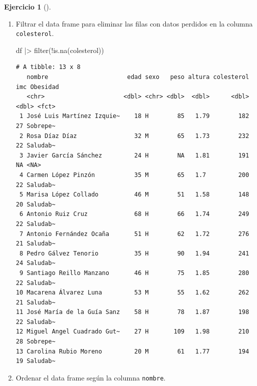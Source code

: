 \documentclass[
  a4paper,
]{scrreport}
\newenvironment{Shaded}{\begin{snugshade}}{\end{snugshade}}
\newcommand{\FunctionTok}[1]{\textcolor[rgb]{0.28,0.35,0.67}{#1}}
\newcommand{\NormalTok}[1]{\textcolor[rgb]{0.00,0.23,0.31}{#1}}
\newcommand{\SpecialCharTok}[1]{\textcolor[rgb]{0.37,0.37,0.37}{#1}}
\theoremstyle{definition}
\newtheorem{exercise}{Ejercicio}[chapter]
\theoremstyle{remark}
\begin{document}
\begin{exercise}[]
\begin{enumerate}
\begin{tcolorbox}
  \end{tcolorbox}
\item
  Filtrar el data frame para eliminar las filas con datos perdidos en la
  columna \texttt{colesterol}.

  \begin{tcolorbox}[enhanced jigsaw, toprule=.15mm, rightrule=.15mm, arc=.35mm, colback=white, colbacktitle=quarto-callout-tip-color!10!white, toptitle=1mm, left=2mm, colframe=quarto-callout-tip-color-frame, opacityback=0, breakable, opacitybacktitle=0.6, bottomtitle=1mm, titlerule=0mm, title=\textcolor{quarto-callout-tip-color}{\faLightbulb}\hspace{0.5em}{Solución}, bottomrule=.15mm, coltitle=black, leftrule=.75mm]

\begin{Shaded}
\begin{Highlighting}[]
\NormalTok{df }\SpecialCharTok{|\textgreater{}}
    \FunctionTok{filter}\NormalTok{(}\SpecialCharTok{!}\FunctionTok{is.na}\NormalTok{(colesterol))}
\end{Highlighting}
\end{Shaded}

\begin{verbatim}
# A tibble: 13 x 8
   nombre                      edad sexo   peso altura colesterol   imc Obesidad
   <chr>                      <dbl> <chr> <dbl>  <dbl>      <dbl> <dbl> <fct>   
 1 José Luis Martínez Izquie~    18 H        85   1.79        182    27 Sobrepe~
 2 Rosa Díaz Díaz                32 M        65   1.73        232    22 Saludab~
 3 Javier García Sánchez         24 H        NA   1.81        191    NA <NA>    
 4 Carmen López Pinzón           35 M        65   1.7         200    22 Saludab~
 5 Marisa López Collado          46 M        51   1.58        148    20 Saludab~
 6 Antonio Ruiz Cruz             68 H        66   1.74        249    22 Saludab~
 7 Antonio Fernández Ocaña       51 H        62   1.72        276    21 Saludab~
 8 Pedro Gálvez Tenorio          35 H        90   1.94        241    24 Saludab~
 9 Santiago Reillo Manzano       46 H        75   1.85        280    22 Saludab~
10 Macarena Álvarez Luna         53 M        55   1.62        262    21 Saludab~
11 José María de la Guía Sanz    58 H        78   1.87        198    22 Saludab~
12 Miguel Angel Cuadrado Gut~    27 H       109   1.98        210    28 Sobrepe~
13 Carolina Rubio Moreno         20 M        61   1.77        194    19 Saludab~
\end{verbatim}

  \end{tcolorbox}
\item
  Ordenar el data frame según la columna \texttt{nombre}.


\end{enumerate}
\end{exercise}
\end{document}
